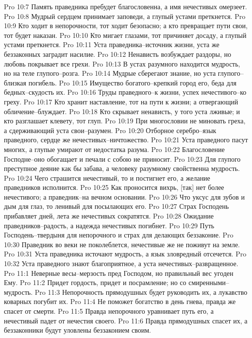 Pro 10:7  Память праведника пребудет благословенна, а имя нечестивых омерзеет.
Pro 10:8  Мудрый сердцем принимает заповеди, а глупый устами преткнется.
Pro 10:9  Кто ходит в непорочности, тот ходит безопасно; а кто превращает пути свои, тот будет наказан.
Pro 10:10  Кто мигает глазами, тот причиняет досаду, а глупый устами преткнется.
Pro 10:11  Уста праведника--источник жизни, уста же беззаконных заградит насилие.
Pro 10:12  Ненависть возбуждает раздоры, но любовь покрывает все грехи.
Pro 10:13  В устах разумного находится мудрость, но на теле глупого--розга.
Pro 10:14  Мудрые сберегают знание, но уста глупого--близкая погибель.
Pro 10:15  Имущество богатого--крепкий город его, беда для бедных--скудость их.
Pro 10:16  Труды праведного--к жизни, успех нечестивого--ко греху.
Pro 10:17  Кто хранит наставление, тот на пути к жизни; а отвергающий обличение--блуждает.
Pro 10:18  Кто скрывает ненависть, у того уста лживые; и кто разглашает клевету, тот глуп.
Pro 10:19  При многословии не миновать греха, а сдерживающий уста свои--разумен.
Pro 10:20  Отборное серебро--язык праведного, сердце же нечестивых--ничтожество.
Pro 10:21  Уста праведного пасут многих, а глупые умирают от недостатка разума.
Pro 10:22  Благословение Господне--оно обогащает и печали с собою не приносит.
Pro 10:23  Для глупого преступное деяние как бы забава, а человеку разумному свойственна мудрость.
Pro 10:24  Чего страшится нечестивый, то и постигнет его, а желание праведников исполнится.
Pro 10:25  Как проносится вихрь, [так] нет более нечестивого; а праведник--на вечном основании.
Pro 10:26  Что уксус для зубов и дым для глаз, то ленивый для посылающих его.
Pro 10:27  Страх Господень прибавляет дней, лета же нечестивых сократятся.
Pro 10:28  Ожидание праведников--радость, а надежда нечестивых погибнет.
Pro 10:29  Путь Господень--твердыня для непорочного и страх для делающих беззаконие.
Pro 10:30  Праведник во веки не поколеблется, нечестивые же не поживут на земле.
Pro 10:31  Уста праведника источают мудрость, а язык зловредный отсечется.
Pro 10:32  Уста праведного знают благоприятное, а уста нечестивых--развращенное.
Pro 11:1  Неверные весы--мерзость пред Господом, но правильный вес угоден Ему.
Pro 11:2  Придет гордость, придет и посрамление; но со смиренными--мудрость.
Pro 11:3  Непорочность прямодушных будет руководить их, а лукавство коварных погубит их.
Pro 11:4  Не поможет богатство в день гнева, правда же спасет от смерти.
Pro 11:5  Правда непорочного уравнивает путь его, а нечестивый падет от нечестия своего.
Pro 11:6  Правда прямодушных спасет их, а беззаконники будут уловлены беззаконием своим.
